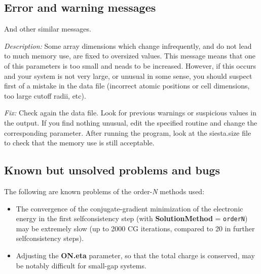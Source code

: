 \documentclass[11pt]{article}
\begin{document}
\subsection{Error and warning messages}

\begin{description}
\itemsep 10pt
\parsep 0pt

\item[{\tt chkdim: ERROR: In {\it routine} dimension {\it parameter} =
{\it value}. It must be  ...}]

And other similar messages.

{\it Description:}
Some array dimensions which change infrequently, and do not lead to
much memory use, are fixed to oversized values. This message means that
one of this parameters is too small and neads to be increased.
However, if this occurs and your system is not very large, or unusual in
some sense, you should suspect first of a mistake in the data file (incorrect
atomic positions or cell dimensions, too large cutoff radii, etc).

{\it Fix:}
Check again the data file. 
Look for previous warnings or suspicious values in the output.
If you find nothing unusual, edit the specified routine and change the 
corresponding parameter.
After running the program, look at the siesta.size file to check that
the memory use is still acceptable.

\end{description}



\subsection{Known but unsolved problems and bugs}

The following are known problems of the order-{\it N} methods used:

\begin{itemize}

\item
The convergence of the conjugate-gradient minimization of the
electronic energy in the first selfconsistency step (with
{\bf SolutionMethod} = {\tt orderN}) may be extremely slow 
(up to 2000 CG iterations, compared to 20 in further 
selfconsistency steps).

\item
Adjusting the {\bf ON.eta} parameter, so that the total charge
is conserved, may be notably difficult for small-gap systems.

\end{itemize}
\end{document}
